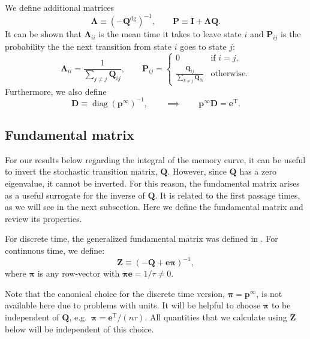 \documentclass[9pt,twocolumn,twoside,lineno]{pnas-new}
\newcommand{\eg}{e.g.\ }
\newcommand{\inv}{^{-1}}
\newcommand{\dg}{^\mathrm{dg}}
\newcommand{\trans}{^\mathrm{T}}
\newcommand{\I}{\mathbf{I}}
\newcommand{\onev}{\mathbf{e}}
\newcommand{\MM}{\mathbf{Q}}
\newcommand{\prob}{\mathbf{p}}
\newcommand{\eq}{\prob^\infty}
\newcommand{\fund}{\mathbf{Z}}
\newcommand{\Pb}{\mathbf{P}}
\newcommand{\D}{\mathbf{D}}
\newcommand{\pib}{\boldsymbol{\pi}}
\newcommand{\Lb}{\boldsymbol{\Lambda}}
\providecommand\hyperref[2][1]{#2}
\begin{document}
\begin{strip}
We define additional matrices
%
\begin{equation}\label{eq:defDLP}
  \Lb \equiv (-\MM\dg)\inv,
  \qquad
  \Pb \equiv \I + \Lb\MM.
\end{equation}
%
It can be shown that $\Lb_{ii}$ is the mean time it takes to leave state $i$ and $\Pb_{ij}$ is the probability the the next transition from state $i$ goes to state $j$:
%
\begin{equation}\label{eq:LamdaPcmpt}
  \Lb_{ii} = \frac{1}{\sum_{j \neq j} \MM_{ij}},
  \qquad
  \Pb_{ij} = %
  \begin{cases}
     0                                         &\text{if }i=j, \\
     \frac{\MM_{ij}}{\sum_{k \neq j} \MM_{ik}} &\text{otherwise}.
  \end{cases}
\end{equation}
%
Furthermore, we also define
%
\begin{equation}\label{eq:pdotD}
  \D \equiv \operatorname{diag}(\eq)\inv,
  \qquad\implies\qquad
  \eq\D=\onev\trans.
\end{equation}
%

\subsection{Fundamental matrix}\label{sec:fund}

For our results below regarding the integral of the memory curve, it can be useful to invert the stochastic transition matrix, $\MM$.
However, since $\MM$ has a zero eigenvalue, it cannot be inverted.
For this reason, the fundamental matrix arises as a useful surrogate for the inverse of $\MM$.
It is related to the first passage times, as we will see in the \hyperref[sec:fpt]{next subsection}.
Here we define the fundamental matrix and review its properties.

\begin{defn}
  For discrete time, the generalized fundamental matrix was defined in \cite{Kemeny1981fund}.
  For continuous time, we define:
  \begin{equation}\label{eq:funddef}
    \fund \equiv (-\MM + \onev\pib)\inv,
  \end{equation}
  where $\pib$ is any row-vector with $\pib\onev=1/\tau\neq0$.
\end{defn}
Note that the canonical choice for the discrete time version, $\pib=\eq$, is not available here due to problems with units.
It will be helpful to choose $\pib$ to be independent of $\MM$, \eg $\pib=\onev\trans/(n\tau)$.
All quantities that we calculate using $\fund$ below will be independent of this choice.


\end{strip}
\end{document}
